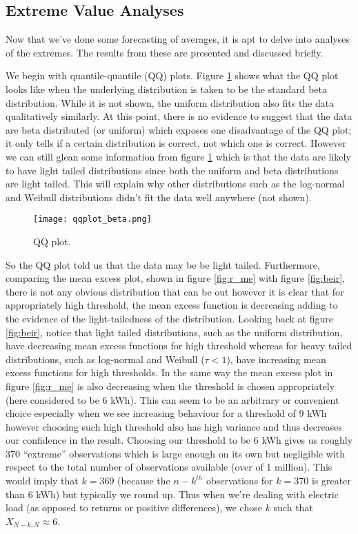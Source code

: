 \documentclass[a4paper]{article}
\begin{document}
\clearpage
\subsection{Extreme Value Analyses}
\label{subsec:EVres}
Now that we've done some forecasting of averages, it is apt to delve into analyses of the extremes. The results from these are presented and discussed briefly.

We begin with quantile-quantile (QQ) plots. Figure \ref{fig:beta} shows what the QQ plot looks like when the underlying distribution is taken to be the standard beta distribution. While it is not shown, the uniform distribution also fits the data qualitatively similarly. At this point, there is no evidence to suggest that the data are beta distributed (or uniform) which exposes one disadvantage of the QQ plot; it only tells if a certain distribution is correct, not which one is correct. However we can still glean some information from figure \ref{fig:beta} which is that the data are likely to have light tailed distributions since both the uniform and beta distributions are light tailed. This will explain why other distributions such as the log-normal and Weibull distributions didn't fit the data well anywhere (not shown). 

\begin{figure}
\centering
\texttt{[image: qqplot\_beta.png]}
\caption{\label{fig:beta} QQ plot.}
\end{figure}

So the QQ plot told us that the data may be be light tailed. Furthermore, comparing the mean excess plot, shown in figure \ref{fig:r_me} with figure \ref{fig:beir}, there is not any obvious distribution that can be out however it is clear that for appropriately high threshold, the mean excess function is decreasing adding to the evidence of the light-tailedness of the distribution. Looking back at figure \ref{fig:beir}, notice that light tailed distributions, such as the uniform distribution, have decreasing mean excess functions for high threshold whereas for heavy tailed distributions, such as log-normal and Weibull ($\tau<1$), have increasing mean excess functions for high thresholds. In the same way the mean excess plot in figure \ref{fig:r_me} is also decreasing when the threshold is chosen appropriately (here considered to be 6 kWh). This can seem to be an arbitrary or convenient choice especially when we see increasing behaviour for a threshold of 9 kWh however choosing such high threshold also has high variance and thus decreases our confidence in the result. Choosing our threshold to be 6 kWh gives us roughly 370 ``extreme'' observations which is large enough on its own but negligible with respect to the total number of observations available (over of 1 million). This would imply that $k=369$ (because the $n-k^{th}$ observations for $k=370$ is greater than 6 kWh) but typically we round up. Thus when we're dealing with electric load (as opposed to returns or positive differences), we chose $k$ such that $X_{N-k,N} \approx 6$.
\end{document}
